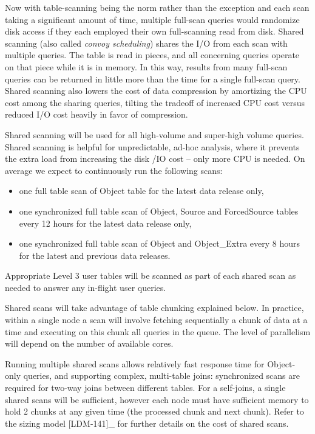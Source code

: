 \documentclass[DM,lsstdraft,toc]{lsstdoc}
\begin{document}
Now with table-scanning being the norm rather than the exception and
each scan taking a significant amount of time, multiple full-scan
queries would randomize disk access if they each employed their own
full-scanning read from disk. Shared scanning (also called \emph{convoy
scheduling}) shares the I/O from each scan with multiple queries. The
table is read in pieces, and all concerning queries operate on that
piece while it is in memory. In this way, results from many full-scan
queries can be returned in little more than the time for a single
full-scan query. Shared scanning also lowers the cost of data
compression by amortizing the CPU cost among the sharing queries,
tilting the tradeoff of increased CPU cost versus reduced I/O cost
heavily in favor of compression.

Shared scanning will be used for all high-volume and super-high volume
queries. Shared scanning is helpful for unpredictable, ad-hoc analysis,
where it prevents the extra load from increasing the disk /IO cost --
only more CPU is needed. On average we expect to continuously run the
following scans:

\begin{itemize}
\item
  one full table scan of Object table for the latest data release only,
\item
  one synchronized full table scan of Object, Source and ForcedSource
  tables every 12 hours for the latest data release only,
\item
  one synchronized full table scan of Object and Object\_Extra every 8
  hours for the latest and previous data releases.
\end{itemize}

Appropriate Level 3 user tables will be scanned as part of each shared
scan as needed to answer any in-flight user queries.

Shared scans will take advantage of table chunking explained below. In
practice, within a single node a scan will involve fetching sequentially
a chunk of data at a time and executing on this chunk all queries in the
queue. The level of parallelism will depend on the number of available
cores.

Running multiple shared scans allows relatively fast response time for
Object-only queries, and supporting complex, multi-table joins:
synchronized scans are required for two-way joins between different
tables. For a self-joins, a single shared scans will be sufficient,
however each node must have sufficient memory to hold 2 chunks at any
given time (the processed chunk and next chunk). Refer to the sizing
model {[}LDM-141{]}\_ for further details on the cost of shared scans.
\end{document}
